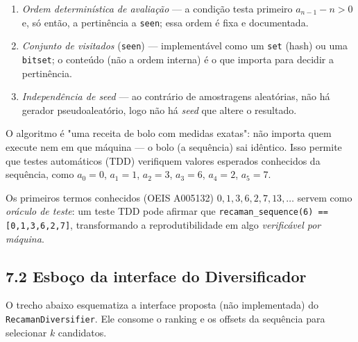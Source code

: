 \begin{enumerate}[label=\arabic*.]
  \item \emph{Ordem determinística de avaliação} --- a condição testa primeiro
        $a_{n-1} - n > 0$ e, só então, a pertinência a \texttt{seen}; essa ordem
        é fixa e documentada.
  \item \emph{Conjunto de visitados} (\texttt{seen}) --- implementável como um
        \texttt{set} (hash) ou uma \texttt{bitset}; o conteúdo (não a ordem
        interna) é o que importa para decidir a pertinência.
  \item \emph{Independência de \emph{seed}} --- ao contrário de amostragens
        aleatórias, não há gerador pseudoaleatório, logo não há \emph{seed} que
        altere o resultado.
\end{enumerate}

\begin{intuicao}
O algoritmo é "uma receita de bolo com medidas exatas": não importa quem execute
nem em que máquina --- o bolo (a sequência) sai idêntico. Isso permite que testes
automáticos (TDD) verifiquem valores esperados conhecidos da sequência, como
$a_0 = 0$, $a_1 = 1$, $a_2 = 3$, $a_3 = 6$, $a_4 = 2$, $a_5 = 7$.
\end{intuicao}

\begin{pontochave}
Os primeiros termos conhecidos (OEIS A005132) $0,1,3,6,2,7,13,\dots$ servem como
\emph{oráculo de teste}: um teste TDD pode afirmar que
\texttt{recaman\_sequence(6) == [0,1,3,6,2,7]}, transformando a reprodutibilidade
em algo \emph{verificável por máquina}.
\end{pontochave}

\subsection*{7.2 Esboço da interface do Diversificador}

 O trecho abaixo esquematiza a interface proposta (não implementada) do
\texttt{RecamanDiversifier}. Ele consome o ranking e os offsets da sequência para
selecionar $k$ candidatos.

